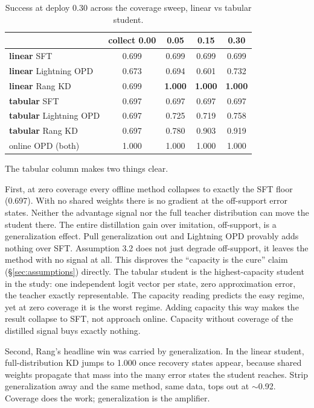 \documentclass[11pt]{article}
\begin{document}
\begin{table}[h]
\centering
\small
\begin{tabular}{l c c c c}
\toprule
 & \textbf{collect 0.00} & \textbf{0.05} & \textbf{0.15} & \textbf{0.30} \\
\midrule
\textbf{linear} SFT          & 0.699 & 0.699 & 0.699 & 0.699 \\
\textbf{linear} Lightning OPD& 0.673 & 0.694 & 0.601 & 0.732 \\
\textbf{linear} Rang KD      & 0.699 & \textbf{1.000} & \textbf{1.000} & \textbf{1.000} \\
\textbf{tabular} SFT         & 0.697 & 0.697 & 0.697 & 0.697 \\
\textbf{tabular} Lightning OPD & 0.697 & 0.725 & 0.719 & 0.758 \\
\textbf{tabular} Rang KD     & 0.697 & 0.780 & 0.903 & 0.919 \\
online OPD (both)            & 1.000 & 1.000 & 1.000 & 1.000 \\
\bottomrule
\end{tabular}
\caption{Success at deploy 0.30 across the coverage sweep, linear vs tabular student.}
\label{tab:repr}
\end{table}

The tabular column makes two things clear.

First, at zero coverage every offline method collapses to exactly the SFT
floor (0.697). With no shared weights there is no gradient at the off-support
error states. Neither the advantage signal nor the full teacher distribution can
move the student there. The entire distillation gain over imitation, off-support,
is a generalization effect. Pull generalization out and Lightning OPD provably adds
nothing over SFT. Assumption 3.2 does not just degrade off-support, it leaves
the method with no signal at all. This disproves the ``capacity is the cure'' claim
(\S\ref{sec:assumptions}) directly. The tabular student is the highest-capacity
student in the study: one independent logit vector per state, zero approximation
error, the teacher exactly representable. The capacity reading predicts the easy
regime, yet at zero coverage it is the worst regime. Adding capacity this way makes
the result collapse to SFT, not approach online. Capacity without coverage of the
distilled signal buys exactly nothing.

Second, Rang's headline win was carried by generalization. In the linear
student, full-distribution KD jumps to 1.000 once recovery states appear, because
shared weights propagate that mass into the many error states the student reaches.
Strip generalization away and the same method, same data, tops out at $\sim$0.92.
Coverage does the work; generalization is the amplifier.
\end{document}
